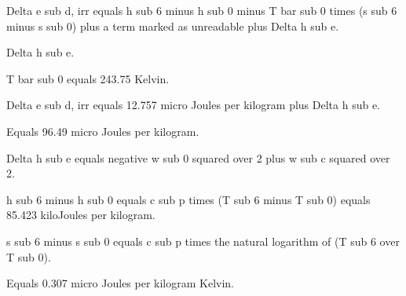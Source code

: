 Delta e sub d, irr equals h sub 6 minus h sub 0 minus T bar sub 0 times (s sub 6 minus s sub 0) plus a term marked as unreadable plus Delta h sub e.

Delta h sub e.

T bar sub 0 equals 243.75 Kelvin.

Delta e sub d, irr equals 12.757 micro Joules per kilogram plus Delta h sub e.

Equals 96.49 micro Joules per kilogram.

Delta h sub e equals negative w sub 0 squared over 2 plus w sub c squared over 2.

h sub 6 minus h sub 0 equals c sub p times (T sub 6 minus T sub 0) equals 85.423 kiloJoules per kilogram.

s sub 6 minus s sub 0 equals c sub p times the natural logarithm of (T sub 6 over T sub 0).

Equals 0.307 micro Joules per kilogram Kelvin.